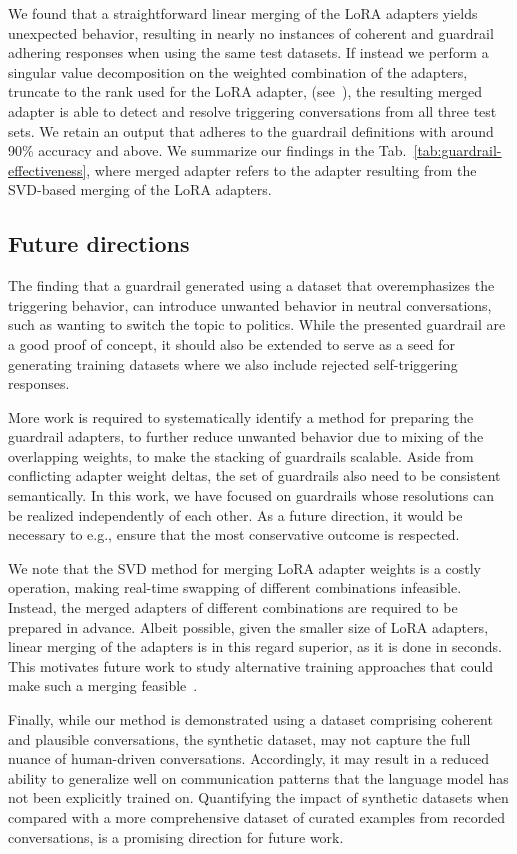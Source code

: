 \documentclass[letterpaper]{article}
\begin{document}
We found that a straightforward linear merging of the LoRA adapters yields unexpected behavior, resulting in nearly no instances of coherent and guardrail adhering responses when using the same test datasets. 
If instead we perform a singular value decomposition on the weighted combination of the adapters, truncate to the rank used for the LoRA adapter,
(see~\cite{code}), the resulting merged adapter is able to detect and resolve triggering conversations from all three test sets. 
We retain an output that adheres to the guardrail definitions with around 90\% accuracy and above. We summarize our findings in the Tab.~\ref{tab:guardrail-effectiveness}, where merged adapter refers to the adapter resulting from the SVD-based merging of the LoRA adapters.


\subsection{Future directions}
The finding that a guardrail generated using a dataset that overemphasizes the triggering behavior, can introduce unwanted behavior in neutral conversations, such as wanting to switch the topic to politics. While the presented guardrail are a good proof of concept, it should also be extended to serve as a seed for generating training datasets where we also include rejected self-triggering responses. 

More work is required to systematically identify a method for preparing the guardrail adapters, to further reduce unwanted behavior due to mixing of the overlapping weights, to make the stacking of guardrails scalable.
Aside from conflicting adapter weight deltas, the set of guardrails also need to be consistent semantically. In this work, we have focused on guardrails whose resolutions can be realized independently of each other. As a future direction, it would be necessary to e.g., ensure that the most conservative outcome is respected. 

We note that the SVD method for merging LoRA adapter weights is a costly operation, making real-time swapping of different combinations infeasible. 
Instead, the merged adapters of different combinations are required to be prepared in advance. Albeit possible, given the smaller size of LoRA adapters, linear merging of the adapters is in this regard superior, as it is done in seconds. This motivates future work to study alternative training approaches that could make such a merging feasible~\cite{hu2024learn}.

Finally, while our method is demonstrated using a dataset comprising coherent and plausible conversations, 
the synthetic dataset, may not capture the full nuance of human-driven conversations. Accordingly, it may result in a reduced ability to generalize well on communication patterns that the language model has not been explicitly trained on. 
Quantifying the impact of synthetic datasets when compared with a more comprehensive dataset of curated examples from recorded conversations, is a promising direction for future work. 
\end{document}
